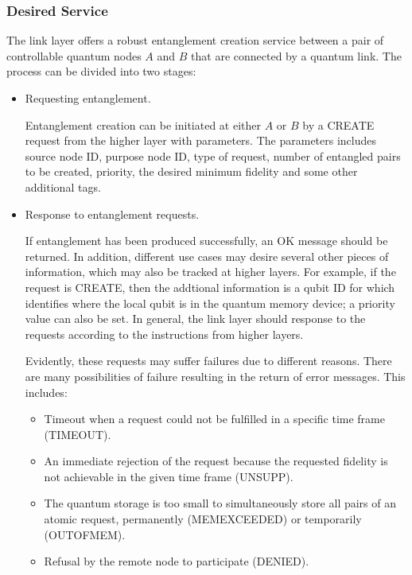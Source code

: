 \documentclass[10pt]{article}
\begin{document}
\subsubsection{Desired Service}

The link layer offers a robust entanglement creation service between a pair of controllable quantum nodes $A$ and $B$ that are connected by a quantum link. The process can be divided into two stages:

\begin{itemize}
    \item Requesting entanglement.
    
    Entanglement creation
    can be initiated at either $A$ or $B$ by a CREATE request from
    the higher layer with parameters. The parameters includes source node ID, purpose node ID, type of request, number of entangled pairs to be created, priority, the desired minimum
    fidelity and some other additional tags. 

    \item Response to entanglement requests.
    
    If entanglement has been produced successfully, an OK message should be returned. In addition, different use cases may desire several other pieces of information, which may also be tracked at higher layers. For example, if the request is CREATE, then the addtional information is a qubit ID for which identifies where the local qubit is in the quantum memory device; a priority value can also be set. In general, the link layer should response to the requests according to the instructions from higher layers.


    Evidently, these requests may suffer failures due to different reasons. There are many possibilities of failure resulting in the return of error messages. This includes:
    \begin{itemize}
        \item Timeout when a request could not be fulfilled in a specific time frame (TIMEOUT).
        \item An immediate rejection of the request because the requested fidelity is not achievable in the given time frame (UNSUPP).
        
        \item The quantum storage is too small to simultaneously store all pairs of an atomic request, permanently (MEMEXCEEDED) or temporarily (OUTOFMEM).
        
        \item Refusal by the remote node to participate (DENIED).
    \end{itemize}


\end{itemize}
\end{document}
